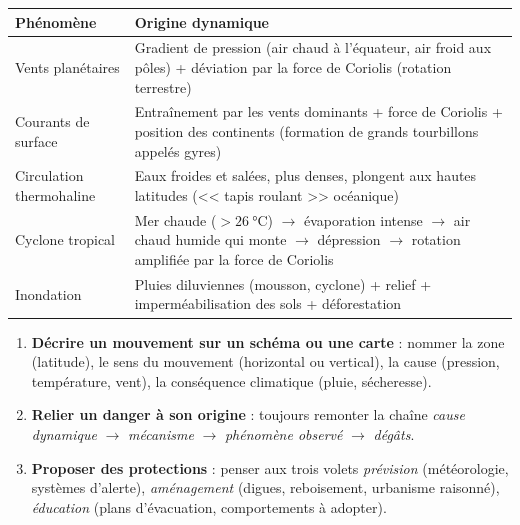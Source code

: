\documentclass[11pt]{article}
\begin{document}
\begin{aretenir}
\begin{center}
\begin{tabularx}{\linewidth}{|l|X|}
\hline
\rowcolor{popblueL} \textbf{Phénomène} & \textbf{Origine dynamique} \\
\hline
Vents planétaires & Gradient de pression (air chaud à l'équateur, air froid aux pôles) + déviation par la force de Coriolis (rotation terrestre) \\
\hline
Courants de surface & Entraînement par les vents dominants + force de Coriolis + position des continents (formation de grands tourbillons appelés gyres) \\
\hline
Circulation thermohaline & Eaux froides et salées, plus denses, plongent aux hautes latitudes (<< tapis roulant >> océanique) \\
\hline
Cyclone tropical & Mer chaude ($>\SI{26}{\celsius}$) $\rightarrow$ évaporation intense $\rightarrow$ air chaud humide qui monte $\rightarrow$ dépression $\rightarrow$ rotation amplifiée par la force de Coriolis \\
\hline
Inondation & Pluies diluviennes (mousson, cyclone) + relief + imperméabilisation des sols + déforestation \\
\hline
\end{tabularx}
\end{center}
\end{aretenir}

\begin{methode}
\begin{enumerate}
  \item \textbf{Décrire un mouvement sur un schéma ou une carte} : nommer la zone (latitude), le sens du mouvement (horizontal ou vertical), la cause (pression, température, vent), la conséquence climatique (pluie, sécheresse).
  \item \textbf{Relier un danger à son origine} : toujours remonter la chaîne \emph{cause dynamique} $\rightarrow$ \emph{mécanisme} $\rightarrow$ \emph{phénomène observé} $\rightarrow$ \emph{dégâts}.
  \item \textbf{Proposer des protections} : penser aux trois volets \emph{prévision} (météorologie, systèmes d'alerte), \emph{aménagement} (digues, reboisement, urbanisme raisonné), \emph{éducation} (plans d'évacuation, comportements à adopter).
\end{enumerate}
\end{methode}
\end{document}
